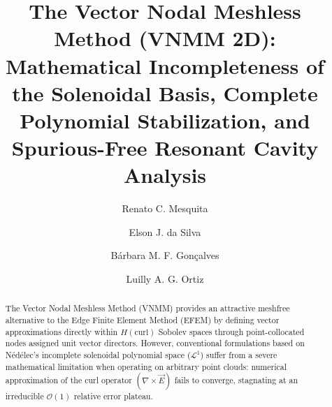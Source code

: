 \documentclass[preprint,12pt]{elsarticle}
\begin{document}
\begin{frontmatter}



\title{The Vector Nodal Meshless Method (VNMM 2D): Mathematical Incompleteness of the Solenoidal Basis, Complete Polynomial Stabilization, and Spurious-Free Resonant Cavity Analysis}



\author[ufmg]{Renato C. Mesquita}
\author[ufmg]{Elson J. da Silva}
\author[ufmg]{Bárbara M. F. Gonçalves}
\author[ufmg]{Luilly A. G. Ortiz}



\begin{abstract}
The Vector Nodal Meshless Method (VNMM) provides an attractive meshfree alternative to the Edge Finite Element Method (EFEM) by defining vector approximations directly within $H(\mathrm{curl})$ Sobolev spaces through point-collocated nodes assigned unit vector directors. However, conventional formulations based on N\'ed\'elec's incomplete solenoidal polynomial space ($\mathcal{L}^1$) suffer from a severe mathematical limitation when operating on arbitrary point clouds: numerical approximation of the curl operator $(\nabla \times \vec{E})$ fails to converge, stagnating at an irreducible $\mathcal{O}(1)$ relative error plateau.


\end{abstract}
\end{frontmatter}
\end{document}

